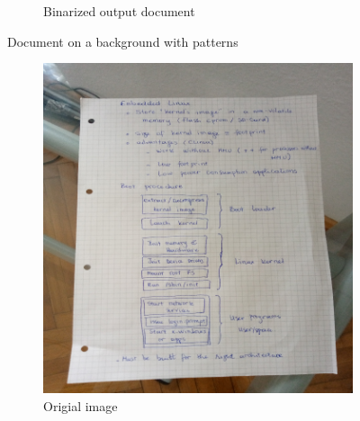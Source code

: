 \documentclass{scrartcl}
\begin{document}
\begin{figure}[!htbp]
\begin{subfigure}[b]{0.3\textwidth}
      \caption{Binarized output document}
    \end{subfigure}

    \caption{Document on a background with patterns}
    \label{figure:doc-on-table-patterns}
  \end{figure}

  \begin{figure}[!htbp]
    \centering
    \begin{subfigure}[b]{0.3\textwidth}
      \centering
      \includegraphics[width=\textwidth]{pictures/results/glass/original.png}
      \caption{Origial image}
    \end{subfigure}
    \begin{subfigure}[b]{0.3\textwidth}
      \centering

\end{subfigure}
\end{figure}
\end{document}
